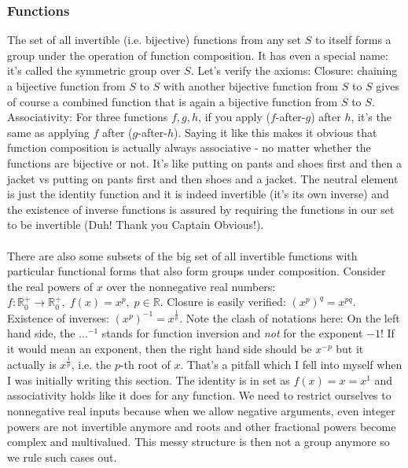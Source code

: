
\subsubsection{Functions}
The set of all invertible (i.e. bijective) functions from any set $S$ to itself forms a group under the operation of function composition. It has even a special name: it's called the symmetric group over $S$. Let's verify the axioms: Closure: chaining a bijective function from $S$ to $S$ with another bijective function from $S$ to $S$ gives of course a combined function that is again a bijective function from $S$ to $S$. Associativity: For three functions $f,g,h$, if you apply ($f$-after-$g$) after $h$, it's the same as applying $f$ after ($g$-after-$h$). Saying it like this makes it obvious that function composition is actually always associative - no matter whether the functions are bijective or not. It's like putting on pants and shoes first and then a jacket vs putting on pants first and then shoes and a jacket. The neutral element is just the identity function and it is indeed invertible (it's its own inverse) and the existence of inverse functions is assured by requiring the functions in our set to be invertible (Duh! Thank you Captain Obvious!).

\paragraph{} There are also some subsets of the big set of all invertible functions with particular functional forms that also form groups under composition. Consider the real powers of $x$ over the nonnegative real numbers: $f: \mathbb{R}^+_0 \rightarrow \mathbb{R}^+_0, \; f(x) = x^p, \; p \in \mathbb{R}$. Closure is easily verified: $(x^p)^q = x^{p q}$. Existence of inverses: $(x^p)^{-1} = x^{\frac{1}{p}}$. Note the clash of notations here: On the left hand side, the $...^{-1}$ stands for function inversion and \emph{not} for the exponent $-1$! If it would mean an exponent, then the right hand side should be $x^{-p}$ but it actually is $x^{\frac{1}{p}}$, i.e. the $p$-th root of $x$. That's a pitfall which I fell into myself when I was initially writing this section. The identity is in set as $f(x) = x = x^1$ and associativity holds like it does for any function. We need to restrict ourselves to nonnegative real inputs because when we allow negative arguments, even integer powers are not invertible anymore and roots and other fractional powers become complex and multivalued. This messy structure is then not a group anymore so we rule such cases out.

